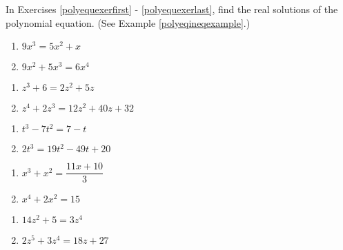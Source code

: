 In Exercises \ref{polyequexerfirst} - \ref{polyequexerlast}, find the real solutions of the polynomial equation.  (See Example \ref{polyeqineqexample}.)

\begin{multicols}{2}
\begin{enumerate}
\setcounter{enumi}{\value{HW}}

\item  $9x^{3} = 5x^{2} + x$  \label{polyequexerfirst} 
\item $9x^{2}+5x^{3}= 6x^{4}$  

\setcounter{HW}{\value{enumi}}
\end{enumerate}
\end{multicols}

\begin{multicols}{2}
\begin{enumerate}
\setcounter{enumi}{\value{HW}}

\item $z^{3} + 6 = 2z^{2} + 5z$ 
\item $z^{4} + 2z^{3} = 12z^{2} + 40z + 32$ 

\setcounter{HW}{\value{enumi}}
\end{enumerate}
\end{multicols}


\begin{multicols}{2}
\begin{enumerate}
\setcounter{enumi}{\value{HW}}

\item $t^{3} - 7t^{2} = 7-t$ 
\item $2t^{3} = 19t^{2} - 49t + 20$ 

\setcounter{HW}{\value{enumi}}
\end{enumerate}
\end{multicols}

\begin{multicols}{2}
\begin{enumerate}
\setcounter{enumi}{\value{HW}}

\item $x^{3} + x^{2} = \dfrac{11x + 10}{3}$ 
\item $x^4+2x^2 = 15$ 


\setcounter{HW}{\value{enumi}}
\end{enumerate}
\end{multicols}

\begin{multicols}{2}
\begin{enumerate}
\setcounter{enumi}{\value{HW}}

\item $14z^{2}+5=3z^{4}$  

\item $2z^5+3z^4 = 18z + 27$ \label{polyequexerlast}  

\setcounter{HW}{\value{enumi}}
\end{enumerate}
\end{multicols}


